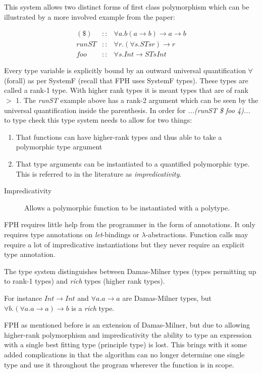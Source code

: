 This system allows two distinct forms of first class polymorphism which can be illustrated by a more involved example from the paper\cite{FPH}:

\begin{eqnarray*}
(\$)  &::& \forall a. b (a\rightarrow b) \rightarrow a \rightarrow b\\
runST &::& \forall r. (\forall s. ST s r) \rightarrow r\\
foo   &::& \forall s. Int \rightarrow ST s Int
\end{eqnarray*}

Every type variable is explicitly bound by an outward universal quantification $\forall$ (forall) as per SystemF (recall that FPH uses SystemF types). These types are called a rank-1 type. With higher rank types it is meant types that are of rank $>$ 1.
The \textit{runST} example above has a rank-2 argument which can be seen by the universal quantification inside the parenthesis.
In order for \textit{...(runST \$ foo 4)...} to type check this type system needs to allow for two things:
\begin{enumerate}
\item That functions can have higher-rank types and thus able to take a polymorphic type argument
\item That type arguments can be instantiated to a quantified polymorphic type. This is referred to in the literature as \textit{impredicativity}.
\end{enumerate}

\begin{description}
\item[Impredicativity] Allows a polymorphic function to be instantiated with a polytype. 
\end{description}

FPH requires little help from the programmer in the form of annotations. It only requires type annotations on \textit{let}-bindings or $\lambda$-abstractions. Function calls may require a lot of impredicative instantiations but they never require an explicit type annotation.

The type system distinguishes between Damas-Milner types (types permitting up to rank-1 types) and \textit{rich} types (higher rank types).

For instance $Int \rightarrow Int$ and $\forall a. a \rightarrow a$ are Damas-Milner types, but $\forall b.(\forall a. a \rightarrow a) \rightarrow b$ is a \textit{rich} type.

FPH as mentioned before is an extension of Damas-Milner, but due to allowing higher-rank polymorphism and impredicativity the ability to type an expression with a single best fitting type (principle type) is lost. This brings with it some added complications in that the algorithm can no longer determine one single type and use it throughout the program wherever the function is in scope.

